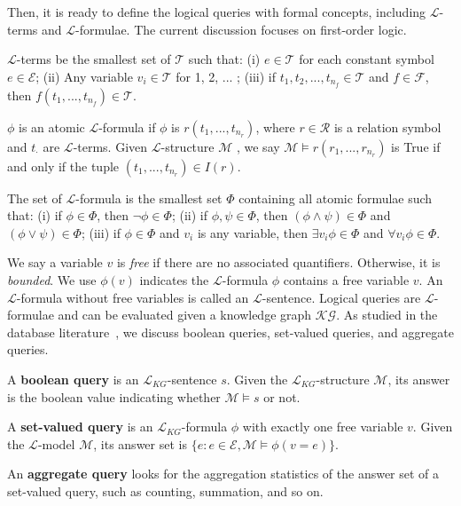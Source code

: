 \documentclass[11pt]{article}
\newcommand{\entity}{\mathcal{E}}
\newcommand{\relation}{\mathcal{R}}
\newcommand{\lang}{\mathcal{L}}
\newcommand{\model}{\mathcal{M}}
\newcommand{\term}{\mathcal{T}}
\newcommand{\kg}{\mathcal{KG}}
\begin{document}
Then, it is ready to define the logical queries with formal concepts, including $\lang$-terms and $\lang$-formulae.
The current discussion focuses on first-order logic.
\begin{definition}[$\lang$-term]\label{def:term}
$\lang$-terms be the smallest set of $\term$ such that:
(i) $e\in\term$ for each constant symbol $e \in \entity$;
(ii) Any variable $v_i \in \term$ for 1, 2, ... ;
(iii) if $t_1, t_2, ..., t_{n_f}\in \term$ and $f \in \mathcal{F}$, then $f(t_1, ..., t_{n_f}) \in \term$.
\end{definition}
\begin{definition}[Atomic $\lang$-formula]\label{def:atomic-formula}
    $\phi$ is an atomic $\lang$-formula if $\phi$ is $r(t_1, ..., t_{n_r})$, where $r\in \relation$ is a relation symbol and $t_\cdot$ are $\lang$-terms. Given $\lang$-structure $\model$ , we say $\model\models r(r_1, ..., r_{n_r})$ is True if and only if the tuple $(t_1, ..., t_{n_r})\in I(r)$.
\end{definition}
\begin{definition}[$\lang$-formula]\label{def:formula}
The set of $\lang$-formula is the smallest set $\Phi$ containing all atomic formulae such that: (i) if $\phi \in \Phi$, then $\lnot \phi \in \Phi$; (ii) if $\phi, \psi\in \Phi$, then $(\phi\land \psi) \in \Phi$ and $(\phi \lor \psi)\in \Phi$; (iii) if $\phi \in \Phi$ and $v_i$ is any variable, then $\exists v_i \phi \in \Phi$ and $\forall v_i \phi \in \Phi$.
\end{definition}
We say a variable $v$ is \textit{free} if there are no associated quantifiers. Otherwise, it is \textit{bounded}. We use $\phi(v)$ indicates the $\lang$-formula $\phi$ contains a free variable $v$. An $\lang$-formula without free variables is called an $\lang$-sentence. Logical queries are $\lang$-formulae and can be evaluated given a knowledge graph $\kg$.
As studied in the database literature~\cite{VandenBroeck2017QueryProcessing}, we discuss boolean queries, set-valued queries, and aggregate queries.

\noindent A \textbf{boolean query} is an $\lang_{KG}$-sentence $s$. Given the $\lang_{KG}$-structure $\model$, its answer is the boolean value indicating whether $\model \models s$ or not.

\noindent A \textbf{set-valued query} is an $\lang_{KG}$-formula $\phi$ with exactly one free variable $v$. Given  the $\lang$-model $\model$, its answer set is $\{e:  e\in \entity, \model\models \phi(v=e) \}$.

\noindent An \textbf{aggregate query} looks for the aggregation statistics of the answer set of a set-valued query, such as counting, summation, and so on. 
\end{document}

